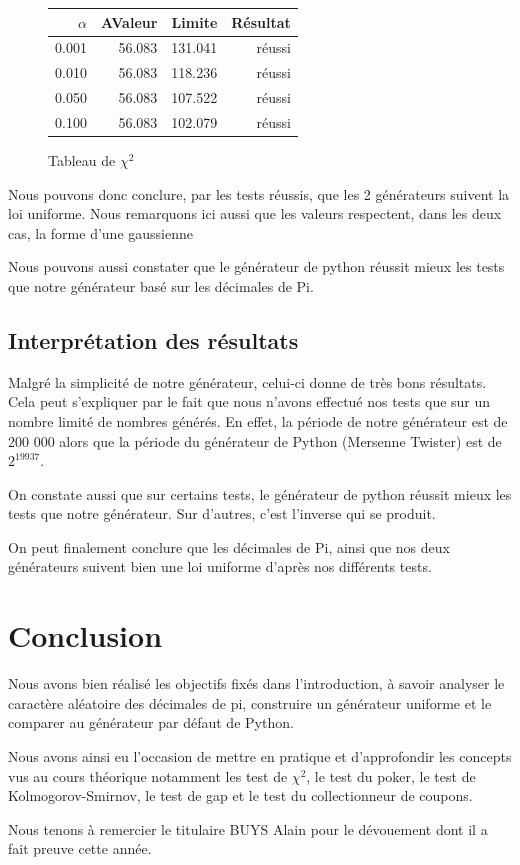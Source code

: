 \documentclass[10pt,a4paper]{article}
\begin{document}

\begin{figure}[h]
\centering
\begin{tabular}{|r|r|r|r|}
\hline
$\alpha$ & AValeur & Limite & Résultat\\
\hline
0.001 & 56.083 & 131.041 & réussi\\
0.010 & 56.083 & 118.236 & réussi\\
0.050 & 56.083 & 107.522 & réussi\\
0.100 & 56.083 & 102.079 & réussi\\
\hline
\end{tabular}
\caption{Tableau de $\chi^2$}
\end{figure}
    
    
Nous pouvons donc conclure, par les tests réussis, que les 2 générateurs suivent la loi uniforme. Nous remarquons ici aussi que les valeurs respectent, dans les deux cas, la forme d'une gaussienne

Nous pouvons aussi constater que le générateur de python réussit mieux les tests que notre générateur basé sur les décimales de Pi. 
  	
	\newpage
	\subsection{Interprétation des résultats}
	Malgré la simplicité de notre générateur, celui-ci donne de très bons résultats.
	Cela peut s'expliquer par le fait que nous n'avons effectué nos tests que sur un nombre limité de nombres générés. 
	En effet, la période de notre générateur est de 200 000 alors que la période du générateur de Python (Mersenne Twister) est de $2^{19937}$.
	
	On constate aussi que sur certains tests, le générateur de python réussit mieux les tests que notre générateur. Sur d'autres, c'est l'inverse qui se produit.
	
	
	On peut finalement conclure que les décimales de Pi, ainsi que nos deux générateurs suivent bien une loi uniforme d'après nos différents tests.	
	
	
	\section{Conclusion}
	Nous avons bien réalisé les objectifs fixés dans l'introduction, à savoir analyser le caractère aléatoire des décimales de pi, construire un générateur uniforme et le comparer au générateur par défaut de Python.
	
	Nous avons ainsi eu l'occasion de mettre en pratique et d'approfondir les concepts vus au cours théorique notamment les test de $\chi^2$, le test du poker, le test de Kolmogorov-Smirnov, le test de gap et le test du collectionneur de coupons.
	
	Nous tenons à remercier le titulaire BUYS Alain pour le dévouement dont il a fait preuve cette année.
	
\end{document}
